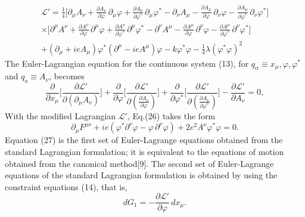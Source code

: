 \documentclass[12pt]{article}
\begin{document}
\begin{multline}\label{25}
\mathcal{L'}=\frac{1}{4}\bigg[\partial_{\mu}A_{\nu}+\frac{\partial
A_{\nu}}{\partial \varphi}\,\partial_{\mu}\varphi+\frac{\partial
A_{\nu}}{\partial \varphi^{\ast}}\,\partial_{\mu}\varphi^{\ast}
-\partial_{\nu}A_{\mu}-\frac{\partial A_{\mu}}{\partial
\varphi}\,\partial_{\nu}\varphi-\frac{\partial A_{\mu}}{\partial
\varphi^{\ast}}\,\partial_{\nu}\varphi^{\ast}\bigg]\\\times
\bigg[\partial^{\mu}A^{\nu}+\frac{\partial A^{\nu}}{\partial
\varphi}\,\partial^{\mu}\varphi+\frac{\partial A^{\nu}}{\partial
\varphi^{\ast}}\,\partial^{\mu}\varphi^{\ast}
-\partial^{\nu}A^{\mu}-\frac{\partial A^{\mu}}{\partial
\varphi}\,\partial^{\nu}\varphi-\frac{\partial A^{\mu}}{\partial
\varphi^{\ast}}\,\partial^{\nu}\varphi^{\ast}\bigg]
\\+
(\partial_{\mu}+ieA_{\mu})\varphi^\ast
(\partial^{\mu}-ieA^{\mu})\varphi-k \varphi^{\ast}
\varphi-\frac{1}{4}\lambda (\varphi^{\ast} \varphi)^2
\end{multline}
The Euler-Lagrangian equation for the continuous system (13), for
$q_\alpha\equiv x_{\mu},\varphi,\varphi^{\ast}$ and $q_a\equiv
A_\nu$, becomes
\begin{equation}\label{26}
\frac{\partial }{\partial x_{\mu}}\bigg[\frac{\partial
\mathcal{L'}}{\partial
(\partial_{\mu}A_{\nu})}\bigg]+\frac{\partial }{\partial
\varphi}\bigg[\frac{\partial \mathcal{L'}}{\partial
(\frac{\partial A_{\nu}}{\partial \varphi})}\bigg]+\frac{\partial
}{\partial \varphi^{\ast}}\bigg[\frac{\partial
\mathcal{L'}}{\partial (\frac{\partial A_{\nu}}{\partial
\varphi^{\ast}})}\bigg] -\frac{\partial \mathcal{L'}}{\partial
A_{\nu}}=0,
\end{equation}\label{27}
With the modified Lagrangian $\mathcal{L'}$, Eq.(26) takes the
form
\begin{equation}
\partial_{\mu}F^{\mu\nu}+ie(\varphi^{\ast}\partial^{\nu}\varphi-\varphi\,\partial^{\nu}\varphi)+2e^{2}A^{\nu}\varphi^{\ast}\varphi=0.
\end{equation}
Equation (27) is the first set of Euler-Lagrange equations
obtained from the standard Lagrangian formulation; it is
equivalent to the equations of motion obtained from the canonical
method[9]. The second set of Euler-Lagrange equations of the
standard Lagrangian formulation is obtained by using the
constraint equations (14), that is,
\begin{equation}\label{28}
dG_{1}=-\frac{\partial \mathcal{L'}}{\partial \varphi}\,dx_{\mu}.
\end{equation}
\end{document}

